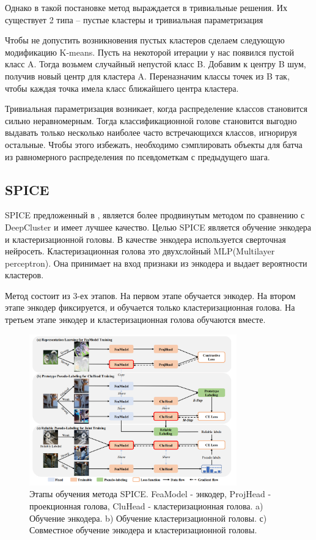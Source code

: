 \documentclass[a4paper,12pt]{extarticle}
\begin{document}
Однако в такой постановке метод выраждается в тривиальные 
решения. Их существует 2 типа -- пустые кластеры и 
тривиальная параметризация

Чтобы не допустить возникновения пустых кластеров 
сделаем следующую модификацию K-means. Пусть 
на некоторой итерации у нас появился пустой 
класс A. Тогда возьмем случайный непустой класс 
B. Добавим к центру B шум, получив новый центр 
для кластера A. Переназначим классы точек из B 
так, чтобы каждая точка имела класс ближайшего 
центра кластера. 

Тривиальная параметризация возникает, когда 
распределение классов становится сильно неравномерным. 
Тогда классификационной голове становится выгодно выдавать 
только несколько наиболее часто встречающихся классов, игнорируя остальные. 
Чтобы этого избежать, необходимо сэмплировать объекты для батча 
из равномерного распределения по псевдометкам с предыдущего шага.

\subsection{SPICE}

SPICE предложенный в \cite{niu2021spice}, является более 
продвинутым методом по сравнению с DeepCluster и имеет лучшее качество.
Целью SPICE является обучение энкодера и кластеризационной головы. 
В качестве энкодера используется сверточная нейросеть.
Кластеризационная голова это двухслойный MLP(Multilayer perceptron). 
Она принимает на вход признаки из энкодера и выдает вероятности 
кластеров.

Метод состоит из 3-ех этапов. На первом этапе обучается энкодер.
На втором этапе энкодер фиксируется, и обучается только кластеризационная
голова. На третьем этапе энкодер и кластеризационная голова обучаются 
вместе. 

\begin{figure}[ht]
	\centering
	\includegraphics[width=0.8\textwidth]{spice.png}
	\caption{Этапы обучения метода SPICE. 
	FeaModel - энкодер, ProjHead - проекционная голова, CluHead - кластеризационная голова. a) Обучение энкодера. b) Обучение кластеризационной головы.
	с) Совместное обучение энкодера и кластеризационной головы. }
	\label{fig:spice}
\end{figure}
\end{document}
